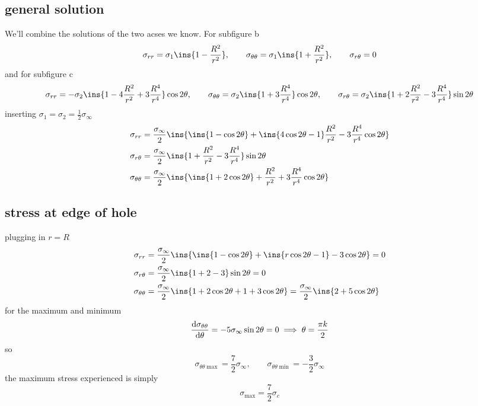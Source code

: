 \subsection{general solution}
We'll combine the solutions of the two acses we know. For subfigure b 
\begin{equation}
    \sigma_{rr}=\sigma_1\ins{1-\frac{R^2}{r^2}},\qquad \sigma_{\theta\theta}=\sigma_1\ins{1+\frac{R^2}{r^2}},\qquad \sigma_{r\theta}=0
\end{equation}
and for subfigure c 
\begin{equation}
    \sigma_{rr}=-\sigma_2\ins{1-4\frac{R^2}{r^2}+3\frac{R^4}{r^4}}\cos2\theta,\qquad\sigma_{\theta\theta}=\sigma_2\ins{1+3\frac{R^4}{r^4}}\cos2\theta,\qquad\sigma_{r\theta}=\sigma_2\ins{1+2\frac{R^2}{r^2}-3\frac{R^4}{r^4}}\sin2\theta
\end{equation}
inserting \(\sigma_1=\sigma_2=\frac{1}{2}\sigma_\infty\)
\begin{align}
    \sigma_{rr}&=\frac{\sigma_\infty}{2}\ins{\ins{1-\cos2\theta}+\ins{4\cos2\theta-1}\frac{R^2}{r^2}-3\frac{R^4}{r^4}\cos2\theta}\\
    \sigma_{r\theta}&=\frac{\sigma_\infty}{2}\ins{1+\frac{R^2}{r^2}-3\frac{R^4}{r^4}}\sin2\theta\\
    \sigma_{\theta\theta}&=\frac{\sigma_\infty}{2}\ins{\ins{1+2\cos2\theta}+\frac{R^2}{r^2}+3\frac{R^4}{r^4}\cos2\theta}
\end{align}
\subsection{stress at edge of hole}
plugging in \(r=R\)
\begin{align}
    \sigma_{rr}&=\frac{\sigma_\infty}{2}\ins{\ins{1-\cos2\theta}+\ins{r\cos2\theta-1}-3\cos2\theta}=0\\
    \sigma_{r\theta}&=\frac{\sigma_\infty}{2}\ins{1+2-3}\sin2\theta=0\\
    \sigma_{\theta\theta}&=\frac{\sigma_\infty}{2}\ins{1+2\cos2\theta+1+3\cos2\theta}=\frac{\sigma_\infty}{2}\ins{2+5\cos2\theta}
\end{align}
for the maximum and minimum
\begin{equation}
    \dv{\sigma_{\theta\theta}}{\theta}=-5\sigma_\infty\sin2\theta=0\implies\theta=\frac{\pi k}{2}
\end{equation}
so 
\begin{equation}
    \sigma_{\theta\theta\max}=\frac{7}{2}\sigma_\infty,\qquad\sigma_{\theta\theta\min}=-\frac{3}{2}\sigma_\infty
\end{equation}
the maximum stress experienced is simply 
\begin{equation}
    \sigma_{\max}=\frac{7}{2}\sigma_c
\end{equation}